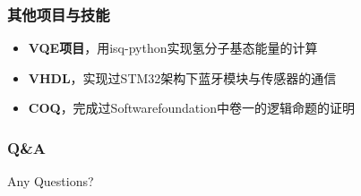 \documentclass[aspectratio=1610]{beamer}
\begin{document}
\begin{frame}
\frametitle{其他项目与技能}
\begin{itemize}
    \item \textbf{VQE项目}，用isq-python实现氢分子基态能量的计算
    \item \textbf{VHDL}，实现过STM32架构下蓝牙模块与传感器的通信
    \item \textbf{COQ}，完成过Softwarefoundation中卷一的逻辑命题的证明
\end{itemize}
\end{frame}

\begin{frame}
\frametitle{Q\&A}
\begin{center}
    Any Questions?
\end{center}
\end{frame}
\end{document}
